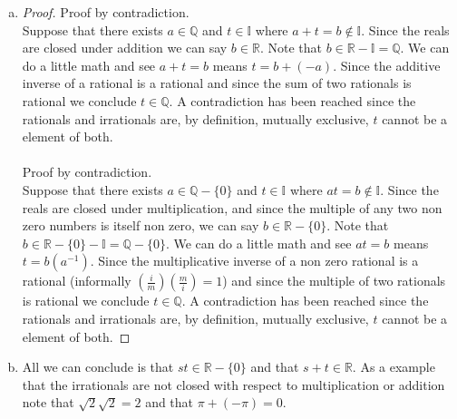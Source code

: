 \documentclass[12pt]{article}
\theoremstyle{homework}
\newcommand{\Rats}{\ensuremath{\mathbb Q}}
\begin{document}
\begin{enumerate}[(a)]
\item \begin{proof}
Proof by contradiction.\\
Suppose that there exists $a\in\Rats$ and $t\in\mathbb{I}$ where $a+t=b\notin\mathbb{I}$.  Since the reals are closed under addition we can say $b\in\mathbb{R}$.  Note that $b\in\mathbb{R} -\mathbb{I}=\mathbb{Q}$.  We can do a little math and see $a+t=b$ means $t=b+(-a)$.  Since the additive inverse of a rational is a rational and since the sum of two rationals is rational we conclude $t\in \mathbb{Q}$.  A contradiction has been reached since the rationals and irrationals are, by definition, mutually exclusive, $t$ cannot be a element of both.\\\\
Proof by contradiction.\\
Suppose that there exists $a\in\Rats-\{0\}$ and $t\in\mathbb{I}$ where $at=b\notin\mathbb{I}$.  Since the reals are closed under multiplication, and since the multiple of any two non zero numbers is itself non zero, we can say $b\in\mathbb{R}-\{0\}$.  Note that $b\in\mathbb{R}-\{0\} -\mathbb{I}=\mathbb{Q}-\{0\}$.  We can do a little math and see $at=b$ means $t=b(a^{-1})$.  Since the multiplicative inverse of a non zero rational is a rational (informally $(\frac{i}{m})(\frac{m}{i})=1$) and since the multiple of two rationals is rational we conclude $t\in \mathbb{Q}$.  A contradiction has been reached since the rationals and irrationals are, by definition, mutually exclusive, $t$ cannot be a element of both.
\end{proof}

\item 
All we can conclude is that $st\in \mathbb{R}-\{0\}$ and that $s+t\in \mathbb{R}$.  As a example that the irrationals are not closed with respect to multiplication or addition note that $\sqrt{2}\sqrt{2}=2$ and that $\pi+(-\pi)=0$.
\end{enumerate}
\end{document}

